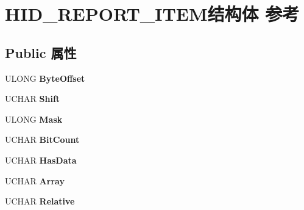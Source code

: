 \hypertarget{struct_h_i_d___r_e_p_o_r_t___i_t_e_m}{}\section{H\+I\+D\+\_\+\+R\+E\+P\+O\+R\+T\+\_\+\+I\+T\+E\+M结构体 参考}
\label{struct_h_i_d___r_e_p_o_r_t___i_t_e_m}
\subsection*{Public 属性}
\begin{DoxyCompactItemize}
\item 
\mbox{\label{struct_h_i_d___r_e_p_o_r_t___i_t_e_m_a7973807d120b4ab7c0e83b39ab820631}} 
U\+L\+O\+NG {\bfseries Byte\+Offset}
\item 
\mbox{\label{struct_h_i_d___r_e_p_o_r_t___i_t_e_m_a2ab85d60bf4a4eab8d7285c3581c5c6c}} 
U\+C\+H\+AR {\bfseries Shift}
\item 
\mbox{\label{struct_h_i_d___r_e_p_o_r_t___i_t_e_m_a0ffbb00109126288ece616c8abe5761f}} 
U\+L\+O\+NG {\bfseries Mask}
\item 
\mbox{\label{struct_h_i_d___r_e_p_o_r_t___i_t_e_m_a7c67bcb47c5df9c556340b1d0c151c11}} 
U\+C\+H\+AR {\bfseries Bit\+Count}
\item 
\mbox{\label{struct_h_i_d___r_e_p_o_r_t___i_t_e_m_a525199bbfb33738f19021a18d74445be}} 
U\+C\+H\+AR {\bfseries Has\+Data}
\item 
\mbox{\label{struct_h_i_d___r_e_p_o_r_t___i_t_e_m_a5696f2ed7ac40c1f96269d5fb69943ce}} 
U\+C\+H\+AR {\bfseries Array}
\item 
\mbox{\label{struct_h_i_d___r_e_p_o_r_t___i_t_e_m_ac3fe04a6153c4b3cfa9874c8d076189d}} 
U\+C\+H\+AR {\bfseries Relative}
\item 
\mbox{\label{struct_h_i_d___r_e_p_o_r_t___i_t_e_m_ab22385161170a8d1a20b8a233a6f91f0}} 

\end{DoxyCompactItemize}
